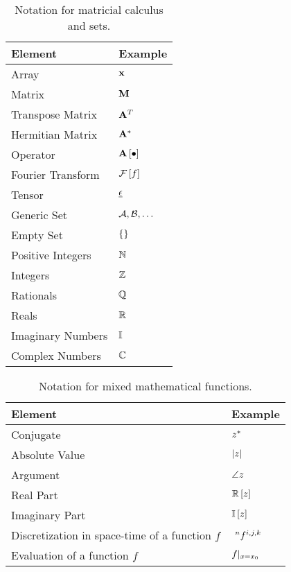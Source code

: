 \begin{table}[htbp]
  \begin{center}
    \begin{tabular}{ll}
      \hline
      Element & Example\\
      \hline
      Array & $\Array{x}$ \\
      Matrix & $\Matrix{M}$ \\
      Transpose Matrix & $\Transpose{\Matrix{A}}$ \\
      Hermitian Matrix\index{Hermitian matrix} & $\Hermitian{\Matrix{A}}$ \\
      Operator & $\Operator{A}{\Anything}$ \\
      Fourier Transform\index{Fourier!transform|tab} & $\Fourier{f}$ \\
      Tensor & $\Tensor{\epsilon}$ \\
      Generic Set & $\Set{A},\Set{B},\dotsc$ \\
      Empty Set & $\EmptySet$ \\
      Positive Integers & $\NaturalSet$ \\
      Integers & $\AllNaturalSet$ \\
      Rationals & $\RationalSet$ \\
      Reals & $\RealSet$ \\
      Imaginary Numbers & $\ImagSet$ \\
      Complex Numbers & $\ComplexSet$ \\
      \hline
    \end{tabular}
  \end{center}
  \caption{Notation for matricial calculus and sets.}
  \label{tab:notation_matrix}
\end{table}

\begin{table}[htbp]
  \begin{center}
    \begin{tabular}{ll}
      \hline
      Element & Example\\
      \hline
      Conjugate & $\Conj{z}$ \\
      Absolute Value & $\Abs{z}$ \\
      Argument & $\Arg{z}$ \\
      Real Part & $\Real{z}$ \\
      Imaginary Part & $\Imag{z}$ \\
      Discretization in space-time of a function $f$ & $\Disc{f}{i,j,k}{n}$ \\
      Evaluation of a function $f$ & $\Evaluate{f}{x=x_0}$ \\
      \hline
    \end{tabular}
  \end{center}
  \caption{Notation for mixed mathematical functions.}
  \label{tab:notation_mathematical}
\end{table}

